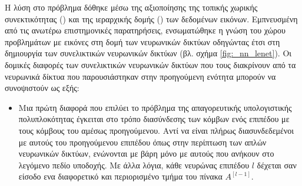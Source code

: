 Η λύση στο πρόβλημα δόθηκε μέσω της αξιοποίησης της τοπικής χωρικής συνεκτικότητας () και της ιεραρχικής δομής () των δεδομένων εικόνων. Εμπνευσμένη από τις ανωτέρω επιστημονικές παρατηρήσεις, ενσωματώθηκε η γνώση του χώρου προβλημάτων με εικόνες στη δομή των νευρωνικών δικτύων οδηγώντας έτσι στη δημιουργία των συνελικτικών νευρωνικών δικτύων (βλ. σχήμα \ref{fig:_nn_lenet}). Οι δομικές διαφορές των συνελικτικών νευρωνικών δικτύων που τους διακρίνουν από τα νευρωνικά δίκτυα που παρουσιάστηκαν στην προηγούμενη ενότητα μπορούν να συνοψιστούν ως εξής:
\begin{itemize}
  \item Μια πρώτη διαφορά που επιλύει το πρόβλημα της απαγορευτικής υπολογιστικής πολυπλοκότητας έγκειται στο τρόπο διασύνδεσης των κόμβων ενός επιπέδου με τους κόμβους του αμέσως προηγούμενου. Αντί να είναι πλήρως διασυνδεδεμένοι με αυτούς του προηγούμενου επιπέδου όπως στην περίπτωση των απλών νευρωνικών δικτύων, ενώνονται με βάρη μόνο με αυτούς που ανήκουν στο λεγόμενο πεδίο υποδοχής. Με άλλα λόγια, κάθε νευρώνας επιπέδου $l$ δέχεται σαν είσοδο ενα διαφορετικό και περιορισμένο τμήμα του πίνακα $A^{[l-1]}$.
 

\end{itemize}
